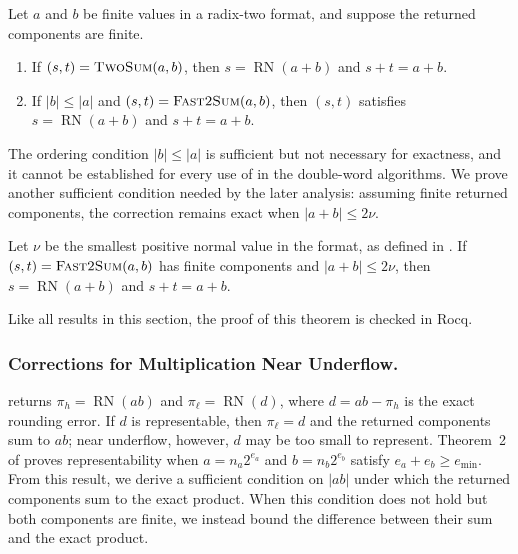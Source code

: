 \begin{theorem}
\label{thm:addition-transformations}
Let $a$ and $b$ be finite values in a radix-two format, and suppose the
returned components are finite.
\begin{enumerate}
  \item If $(s,t)=\textsc{TwoSum}{}(a,b)$, then
    $s=\operatorname{RN}(a+b)$ and $s+t=a+b$.
  \item If $|b|\leq|a|$ and $(s,t)=\textsc{Fast2Sum}{}(a,b)$, then $(s,t)$
    satisfies $s=\operatorname{RN}(a+b)$ and $s+t=a+b$.
\end{enumerate}
\end{theorem}

The ordering condition $|b|\leq|a|$ is sufficient but not necessary
for exactness, and it cannot be established for every use of
\FastTwoSum{} in the double-word algorithms. We prove another
sufficient condition needed by the later analysis: assuming finite
returned components, the correction remains exact when
$|a+b|\leq2\nu$.

\begin{theorem}
\label{thm:fast-two-sum-small}
Let $\nu$ be the smallest positive normal value in the format, as defined in
.  If $(s,t)=\textsc{Fast2Sum}{}(a,b)$ has finite components
and $|a+b|\leq2\nu$, then $s=\operatorname{RN}(a+b)$ and $s+t=a+b$.
\end{theorem}

Like all results in this section, the proof of this theorem is checked in Rocq.

\subsubsection{Corrections for Multiplication Near Underflow.}

\FastTwoMult{} returns
$\pi_h=\operatorname{RN}(ab)$ and
$\pi_\ell=\operatorname{RN}(d)$, where $d=ab-\pi_h$ is the exact rounding
error. If $d$ is representable, then $\pi_\ell=d$ and the returned components
sum to $ab$; near underflow, however, $d$ may be too small to represent.
Theorem~2 of \citet[Section~3]{BoldoDaumas2003} proves representability when
$a=n_a2^{e_a}$ and $b=n_b2^{e_b}$ satisfy
$e_a+e_b\geq e_{\min}$. From this result, we derive a sufficient condition on $|ab|$ under which the
returned components sum to the exact product. When this condition does not
hold but both components are finite, we instead bound the difference between
their sum and the exact product.

